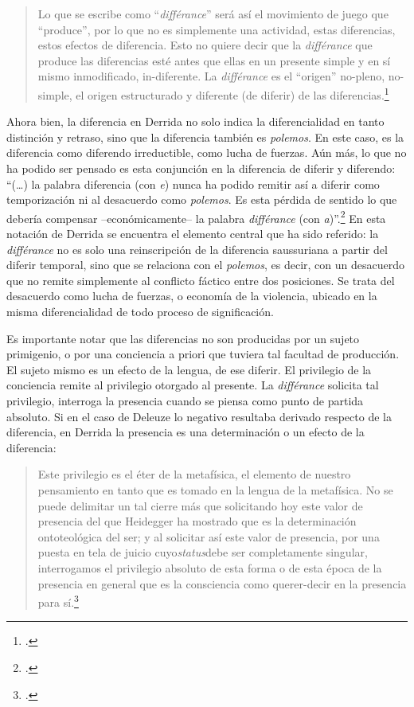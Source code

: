 \begin{quote}
Lo que se escribe como ``\emph{différance}'' será así el movimiento de
juego que ``produce'', por lo que no es simplemente una actividad, estas
diferencias, estos efectos de diferencia. Esto no quiere decir que la
\emph{différance} que produce las diferencias esté antes que ellas en un
presente simple y en sí mismo inmodificado, in-diferente. La
\emph{différance} es el ``origen'' no-pleno, no-simple, el origen
estructurado y diferente (de diferir) de las diferencias.\footcite[12]{derrida1989d}
\end{quote}

Ahora bien, la diferencia en Derrida no solo indica la diferencialidad
en tanto distinción y retraso, sino que la diferencia también es
\emph{polemos}. En este caso, es la diferencia como diferendo
irreductible, como lucha de fuerzas. Aún más, lo que no ha podido ser
pensado es esta conjunción en la diferencia de diferir y diferendo:
\enquote{(\dots) la palabra diferencia (con \emph{e}) nunca ha podido
remitir así a diferir como temporización ni al desacuerdo como
\emph{polemos}. Es esta pérdida de sentido lo que debería compensar
--económicamente-- la palabra \emph{différance} (con
\emph{a})}.\footcite[8]{derrida1989d} En esta notación de Derrida se
encuentra el elemento central que ha sido referido: la \emph{différance}
no es solo una reinscripción de la diferencia saussuriana a partir del
diferir temporal, sino que se relaciona con el \emph{polemos}, es decir,
con un desacuerdo que no remite simplemente al conflicto fáctico entre
dos posiciones. Se trata del desacuerdo como lucha de fuerzas, o
economía de la violencia, ubicado en la misma diferencialidad de todo
proceso de significación.

Es importante notar que las diferencias no son producidas por un sujeto
primigenio, o por una conciencia a priori que tuviera tal facultad de
producción. El sujeto mismo es un efecto de la lengua, de ese diferir.
El privilegio de la conciencia remite al privilegio otorgado al
presente. La \emph{différance} solicita tal privilegio, interroga la
presencia cuando se piensa como punto de partida absoluto. Si en el caso
de Deleuze lo negativo resultaba derivado respecto de la diferencia, en
Derrida la presencia es una determinación o un efecto de la diferencia:

\begin{quote}
Este privilegio es el éter de la metafísica, el elemento de nuestro
pensamiento en tanto que es tomado en la lengua de la metafísica. No se
puede delimitar un tal cierre más que solicitando hoy este valor de
presencia del que Heidegger ha mostrado que es la determinación
ontoteológica del ser; y al solicitar así este valor de presencia, por
una puesta en tela de juicio cuyo\emph{status}debe ser completamente
singular, interrogamos el privilegio absoluto de esta forma o de esta
época de la presencia en general que es la consciencia como querer-decir
en la presencia para sí.\footcite[17]{derrida1989d}
\end{quote}

